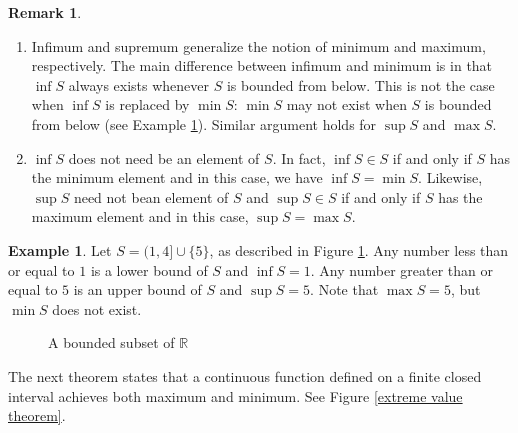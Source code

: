 \documentclass[12pt,letterpaper]{book}
\numberwithin{equation}{section}
\theoremstyle{definition}
\newtheorem{example}[thm]{\textbf{Example}}
\newtheorem{remark}[thm]{\textbf{Remark}}
\begin{document}
\begin{remark}\quad
\begin{enumerate}
\item Infimum and supremum generalize the notion of minimum and maximum, respectively. The main difference between infimum and minimum is in that $\inf S$ always exists whenever $S$ is bounded from below. This is not the case when $\inf S$ is replaced by $\min S$: $\min S$ may not exist when $S$ is bounded from below (see Example \ref{example of sup inf}). Similar argument holds for $\sup S$ and $\max S$.
\item $\inf S$ does not need be an element of $S$. In fact, $\inf S\in S$ if and only if $S$ has the minimum element and in this case, we have $\inf S=\min S$. Likewise, $\sup S$ need not bean element of $S$ and $\sup S\in S$ if and only if $S$ has the maximum element and in this case, $\sup S=\max S$.
\end{enumerate}
\end{remark}

\begin{example}\label{example of sup inf}
Let $S=(1,4]\cup \{5\}$, as described in Figure \ref{supinf}. Any number less than or equal to $1$ is a lower bound of $S$ and $\inf S=1$. Any number greater than or equal to $5$ is an upper bound of $S$ and $\sup S=5$. Note that $\max S=5$, but $\min S$ does not exist.
\end{example}

\begin{figure}[h]
\begin{center}
\caption{A bounded subset of $\mathbb{R}$}
\label{supinf}
\end{center}
\end{figure}

The next theorem states that a continuous function defined on a finite closed interval achieves both maximum and minimum. See Figure \ref{extreme value theorem}.
\end{document}
